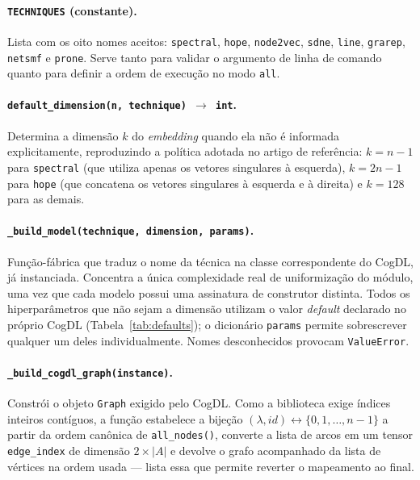 \documentclass[12pt,a4paper]{article}
\begin{document}
\paragraph{\texttt{TECHNIQUES} (constante).}
Lista com os oito nomes aceitos: \texttt{spectral}, \texttt{hope},
\texttt{node2vec}, \texttt{sdne}, \texttt{line}, \texttt{grarep},
\texttt{netsmf} e \texttt{prone}. Serve tanto para validar o argumento de
linha de comando quanto para definir a ordem de execução no modo
\texttt{all}.

\paragraph{\texttt{default\_dimension(n, technique) $\rightarrow$ int}.}
Determina a dimensão $k$ do \textit{embedding} quando ela não é informada
explicitamente, reproduzindo a política adotada no artigo de referência:
$k = n-1$ para \texttt{spectral} (que utiliza apenas os vetores
singulares à esquerda), $k = 2n-1$ para \texttt{hope} (que concatena os
vetores singulares à esquerda e à direita) e $k = 128$ para as demais.

\paragraph{\texttt{\_build\_model(technique, dimension, params)}.}
Função-fábrica que traduz o nome da técnica na classe correspondente do
CogDL, já instanciada. Concentra a única complexidade real de
uniformização do módulo, uma vez que cada modelo possui uma assinatura de
construtor distinta. Todos os hiperparâmetros que não sejam a dimensão
utilizam o valor \textit{default} declarado no próprio CogDL
(Tabela~\ref{tab:defaults}); o dicionário \texttt{params} permite
sobrescrever qualquer um deles individualmente. Nomes desconhecidos
provocam \texttt{ValueError}.

\paragraph{\texttt{\_build\_cogdl\_graph(instance)}.}
Constrói o objeto \texttt{Graph} exigido pelo CogDL. Como a biblioteca
exige índices inteiros contíguos, a função estabelece a bijeção
$(\lambda, id) \leftrightarrow \{0, 1, \ldots, n-1\}$ a partir da ordem
canônica de \texttt{all\_nodes()}, converte a lista de arcos em um tensor
\texttt{edge\_index} de dimensão $2 \times |A|$ e devolve o grafo
acompanhado da lista de vértices na ordem usada --- lista essa que
permite reverter o mapeamento ao final.
\end{document}
